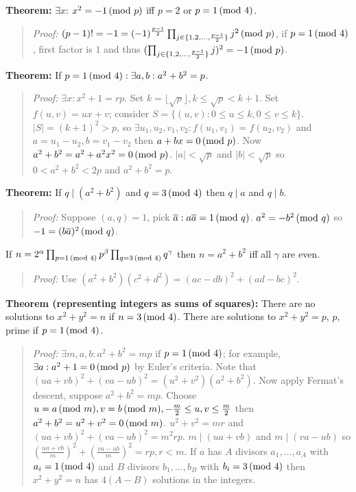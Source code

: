 {\bf Theorem:} $\exists x$: 
$x^2= -1 \thinspace \textnormal{(mod } p \textnormal{)}$ iff $p=2$ or $p= 1 \thinspace \textnormal{(mod } 4 \textnormal{)}$.
\begin{quote}
\emph{Proof:}
$(p-1)!= -1= (-1)^{\frac {p-1} 2} 
\prod_{j \in \{ 1,2, \ldots, {\frac {p-1} 2} \} } j^2 \thinspace \textnormal{(mod } p \textnormal{)}$,
if $p = 1 \thinspace \textnormal{(mod } 4 \textnormal{)}$, first factor is $1$ and thus
$(\prod_{j \in \{ 1,2, \ldots, {\frac {p-1} 2} \} } j)^2 = -1 \thinspace \textnormal{(mod } p \textnormal{)}$.
\end{quote}
{\bf Theorem:} 
If $p= 1 \thinspace \textnormal{(mod } 4 \textnormal{)}: \exists a,b: a^2+b^2=p$.  
\begin{quote}
\emph{Proof:} 
$\exists x: x^2+1= rp$.   Set
$k= \lfloor {\sqrt p} \rfloor, k \leq {\sqrt p} < k+1$.  Set $f(u,v)= ux+v$; consider
$S= \{(u,v): 0 \le u \le k, 0 \le v \le k \}$.  $|S|= (k+1)^2>p$, so 
$\exists u_1, u_2, v_1, v_2 : f(u_1,v_1)=f(u_2, v_2)$ and
$a= u_1-u_2, b= v_1-v_2$ then $a+bx=0 \thinspace \textnormal{(mod } p \textnormal{)}$.  Now $a^2+b^2 = a^2 + a^2 x^2 = 0 \thinspace \textnormal{(mod } p \textnormal{)}$.
$|a| < {\sqrt p}$ and
$|b| < {\sqrt p}$ so
$0<a^2 + b^2<2p$ and $a^2 + b^2= p$.
\end{quote}
{\bf Theorem:} 
If $q \mid (a^2 + b^2)$ and $q = 3 \thinspace \textnormal{(mod } 4 \textnormal{)}$ then $q \mid a$ and $q \mid b$.  
\begin{quote}
\emph{Proof:} 
Suppose $(a,q)=1$, pick ${\overline a}: a {\overline a} = 1 \thinspace \textnormal{(mod } q \textnormal{)}$.
$a^2 = -b^2 \thinspace \textnormal{(mod } q \textnormal{)}$ so $-1= (b {\overline a})^2 \thinspace \textnormal{(mod } q \textnormal{)}$.
\end{quote}
If $n= 2^{\alpha} \prod_{p = 1 \thinspace \textnormal{(mod } 4 \textnormal{)}} p^{\beta} \prod_{q = 3 \thinspace \textnormal{(mod } 4 \textnormal{)}} q^{\gamma}$ then
$n= a^2 + b^2$ iff all $\gamma$ are even.
\begin{quote}
\emph{Proof:} Use $(a^2 + b^2)(c^2 + d^2)=
(ac-db)^2 + (ad-bc)^2$.
\end{quote}
{\bf Theorem (representing integers as sums of squares):}
There are no solutions to $x^2 + y^2 =n$ if
$n= 3 \thinspace \textnormal{(mod } 4 \textnormal{)}$.  There are solutions to $x^2 + y^2 =p$, $p$, prime if
$p= 1 \thinspace \textnormal{(mod } 4 \textnormal{)}$.  
\begin{quote}
\emph{Proof:} $\exists m,a,b: a^2+b^2=mp$ if $p= 1 \thinspace \textnormal{(mod } 4 \textnormal{)}$; for
example, $\exists a: a^2+1 = 0 \thinspace \textnormal{(mod } p \textnormal{)}$ by Euler's criteria.  Note that
$(ua+vb)^2 + (va-ub)^2 = (u^2+v^2)(a^2+b^2)$.  Now apply Fermat's descent,
suppose $a^2+b^2=mp$.  Choose $u=a \thinspace \textnormal{(mod } m \textnormal{)}, v=b \thinspace \textnormal{(mod } m \textnormal{)}, -{\frac m 2} \le u,v \le {\frac m 2}$
then $a^2+b^2=u^2+v^2= 0 \thinspace \textnormal{(mod } m \textnormal{)}$.  $u^2+v^2= mr$ and
$(ua+vb)^2 + (va-ub)^2= m^2 rp$. $m \mid (ua+vb)$ and $m \mid (va-ub)$ so
$({\frac {ua+vb} {m}})^2 + ({\frac {va-ub} {m}})^2 =rp, r<m$.
If $a$ has $A$ divisors $a_1 , \ldots , a_A$ with $a_i = 1 \thinspace \textnormal{(mod } 4 \textnormal{)}$
and $B$ divisors $b_1 , \ldots , b_B$ with $b_i = 3 \thinspace \textnormal{(mod } 4 \textnormal{)}$ then
$x^2 + y^2 =n$ has $4(A-B)$ solutions in the integers.
\end{quote}
